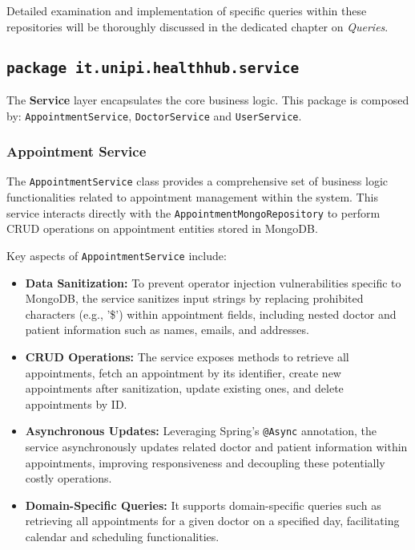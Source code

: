 Detailed examination and implementation of specific queries within these repositories will be thoroughly discussed in the dedicated chapter on \textit{Queries}. 

\subsection{\texttt{package it.unipi.healthhub.service}}
The \textbf{Service} layer encapsulates the core business logic. This package is composed by: \texttt{AppointmentService}, \texttt{DoctorService} and \texttt{UserService}. 


\subsubsection{Appointment Service}
The \texttt{AppointmentService} class provides a comprehensive set of business logic functionalities related to appointment management within the system. This service interacts directly with the \texttt{AppointmentMongoRepository} to perform CRUD operations on appointment entities stored in MongoDB.

Key aspects of \texttt{AppointmentService} include:
\begin{itemize}
	\item \textbf{Data Sanitization:} To prevent operator injection vulnerabilities specific to MongoDB, the service sanitizes input strings by replacing prohibited characters (e.g., '\$') within appointment fields, including nested doctor and patient information such as names, emails, and addresses.
	
	\item \textbf{CRUD Operations:} The service exposes methods to retrieve all appointments, fetch an appointment by its identifier, create new appointments after sanitization, update existing ones, and delete appointments by ID.
	
	\item \textbf{Asynchronous Updates:} Leveraging Spring's \texttt{@Async} annotation, the service asynchronously updates related doctor and patient information within appointments, improving responsiveness and decoupling these potentially costly operations.
	
	\item \textbf{Domain-Specific Queries:} It supports domain-specific queries such as retrieving all appointments for a given doctor on a specified day, facilitating calendar and scheduling functionalities.
\end{itemize}

